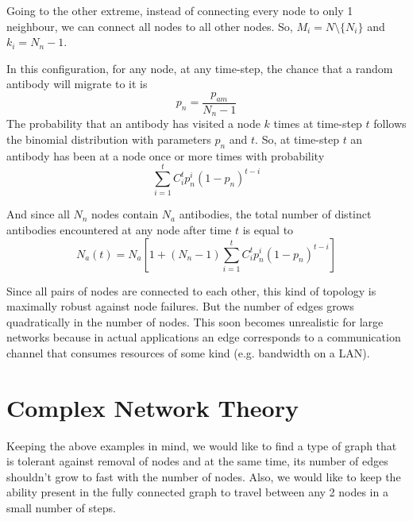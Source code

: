 \documentclass{article}
\begin{document}
Going to the other extreme, instead of connecting every node to only 1 neighbour, we can connect all nodes to all other nodes.
So, $M_i = N \setminus \{N_i\} $  and $k_i = N_n - 1$.

In this configuration, for any node, at any time-step, the chance that a random antibody will migrate to it is 
$$
    p_n = \frac{p_{am}}
               {N_n -1}
$$
The probability that an antibody has visited a node $k$ times at time-step $t$ follows the binomial distribution with parameters $p_n$ and $t$.
So, at time-step $t$ an antibody has been at a node once or more times with probability
$$
   \sum_{i=1}^{t} C_i^t p_n^i (1-p_n)^{t-i}
$$

And since all $N_n$ nodes contain $N_a$ antibodies, the total number of distinct antibodies encountered at any node after time $t$ is equal to 
\begin{equation}
  N_a(t) = N_a [ 1 + (N_n - 1)\sum_{i=1}^{t} C_i^t p_n^i (1-p_n)^{t-i}]
\end{equation}

Since all pairs of nodes are connected to each other, this kind of topology is maximally robust against node failures.
But the number of edges grows quadratically in the number of nodes.
This soon becomes unrealistic for large networks because in actual applications an edge corresponds to a communication channel that consumes resources of some kind (e.g. bandwidth on a LAN).

\section{Complex Network Theory}
\label{sec_network}
Keeping the above examples in mind, we would like to find a type of graph that is tolerant against removal of nodes and
at the same time, its number of edges shouldn't grow to fast with the number of nodes.
Also, we would like to keep the ability present in the fully connected graph to travel between any 2 nodes in a small number of steps.

\end{document}
